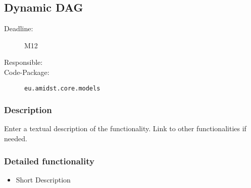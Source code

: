 
\subsection{Dynamic DAG}
\label{Functionality:ID}

\begin{description}
\item[Deadline:] M12
\item[Responsible:]
\item[Code-Package:] \texttt{eu.amidst.core.models}
\end{description}

\subsubsection*{Description}

Enter a textual description of the functionality. Link to other functionalities if needed. 

\subsubsection*{Detailed functionality}

\begin{itemize}
\item Short Description
\end{itemize}